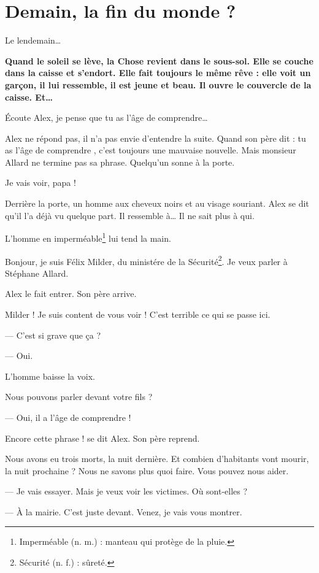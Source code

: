 \chapter{Demain, la fin du monde ?}
Le lendemain\ldots{}

\textbf{Quand le soleil se lève, la Chose revient dans le sous-sol. Elle se couche dans la caisse et s'endort. Elle fait toujours
le même rêve : elle voit un gar\c{c}on, il lui ressemble, il est jeune et beau. Il ouvre le couvercle de la caisse. Et\ldots{}}

\og Écoute Alex, je pense que tu as l'âge de comprendre\ldots{} \fg{}

Alex ne répond pas, il n'a pas envie d'entendre la suite. Quand son père dit : \og tu as l'âge de comprendre \fg{}, c'est
toujours une mauvaise nouvelle. Mais monsieur Allard ne termine pas sa phrase. Quelqu'un sonne à la porte.

\og Je vais voir, papa ! \fg{}

Derrière la porte, un homme aux cheveux noirs et au visage souriant. Alex se dit qu'il l'a déjà vu quelque part. Il ressemble
à\ldots{} Il ne sait plus à qui.

L'homme en imperméable\footnote{Imperméable (n. m.) : manteau qui protège de la pluie.} lui tend la main.

\og Bonjour, je suis Félix Milder, du ministére de la Sécurité\footnote{Sécurité (n. f.) : sûreté.}. Je veux parler à Stéphane
Allard. \fg{}

Alex le fait entrer. Son père arrive.

\og Milder ! Je suis content de vous voir ! C'est terrible ce qui se passe ici.

--- C'est si grave que \c{c}a ?

--- Oui. \fg{}

L'homme baisse la voix.

\og Nous pouvons parler devant votre fils ?

--- Oui, il a l'âge de comprendre ! \fg{}

Encore cette phrase ! se dit Alex. Son père reprend.

\og Nous avons eu trois morts, la nuit dernière. Et combien d'habitants vont mourir, la nuit prochaine ? Nous ne savons plus quoi
faire. Vous pouvez nous aider.

--- Je vais essayer. Mais je veux voir les victimes. Où sont-elles ?

--- À la mairie. C'est juste devant. Venez, je vais vous montrer. \fg{}

